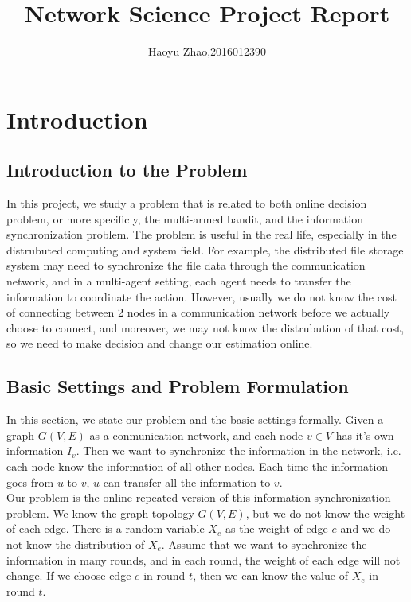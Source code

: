 \documentclass{article}
\title{\bf\huge Network Science Project Report}
\author{Haoyu Zhao,2016012390}
\date{}
\theoremstyle{plain}
\theoremstyle{definition}
\theoremstyle{remark}
\begin{document}
    \maketitle

    \section{Introduction}
    \subsection{Introduction to the Problem}
    In this project, we study a problem that is related to both online decision problem, or more specificly, the multi-armed bandit, and the information synchronization problem. The problem is useful in the real life, especially in the distrubuted computing and system field. For example, the distributed file storage system may need to synchronize the file data through the communication network, and in a multi-agent setting, each agent needs to transfer the information to coordinate the action. However, usually we do not know the cost of connecting between 2 nodes in a communication network before we actually choose to connect, and moreover, we may not know the distrubution of that cost, so we need to make decision and change our estimation online.

    \subsection{Basic Settings and Problem Formulation}
    In this section, we state our problem and the basic settings formally. Given a graph $G(V,E)$ as a conmunication network, and each node $v\in V$ has it's own information $I_v$. Then we want to synchronize the information in the network, i.e. each node know the information of all other nodes. Each time the information goes from $u$ to $v$, $u$ can transfer all the information to $v$.\\

    Our problem is the online repeated version of this information synchronization problem. We know the graph topology $G(V,E)$, but we do not know the weight of each edge. There is a random variable $X_e$ as the weight of edge $e$ and we do not know the distribution of $X_e$. Assume that we want to synchronize the information in many rounds, and in each round, the weight of each edge will not change. If we choose edge $e$ in round $t$, then we can know the value of $X_e$ in round $t$.\\
\end{document}
